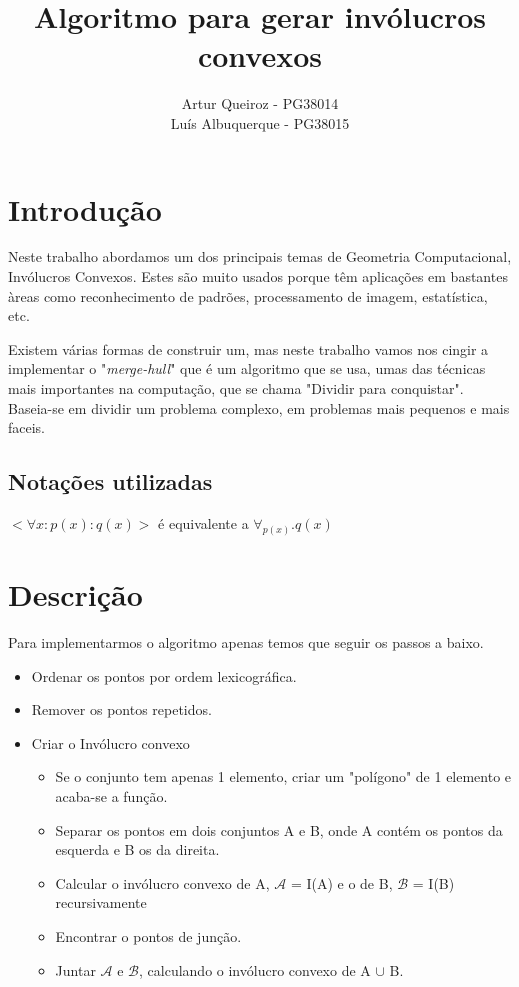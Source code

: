 \documentclass[11pt]{article}
\title{Algoritmo para gerar invólucros convexos}
\author{Artur Queiroz - PG38014\\Luís Albuquerque - PG38015}
\begin{document}
\maketitle

\section{Introdução}
Neste trabalho abordamos um dos principais temas de Geometria 
Computacional, Invólucros Convexos.
Estes são muito usados porque têm aplicações em bastantes àreas
como reconhecimento de padrões, processamento de imagem, 
estatística, etc.

Existem várias formas de construir um, mas neste trabalho vamos
nos cingir a implementar o "\textit{merge-hull}"
que é um algoritmo que se usa, umas das técnicas mais importantes
na computação, que se chama "Dividir para conquistar".
Baseia-se em dividir um problema complexo, em problemas mais 
pequenos e mais faceis.

\subsection{Notações utilizadas}
$<\forall x : p(x) : q(x)>$ é equivalente a $\forall_{p(x)} . q(x)$

\section{Descrição}
Para implementarmos o algoritmo apenas temos que seguir os passos
a baixo.

\begin{itemize}
    \item Ordenar os pontos por ordem lexicográfica.
    \item Remover os pontos repetidos.
    \item Criar o Invólucro convexo
    \begin{itemize}
        \item Se o conjunto tem apenas 1 elemento, criar um "polígono"
            de 1 elemento e acaba-se a função.
        \item Separar os pontos em dois conjuntos A e B, 
            onde A contém os pontos da esquerda e B os da direita.
        \item Calcular o invólucro convexo de A, 
            $\mathcal{A}$ = I(A) e o de B, $\mathcal{B}$ = I(B) recursivamente
        \item Encontrar o pontos de junção.
        \item Juntar $\mathcal{A}$ e $\mathcal{B}$, 
            calculando o invólucro convexo de A $\cup$ B.
    \end{itemize}
\end{itemize}
\end{document}
